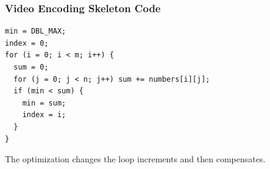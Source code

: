 
\begin{frame}[fragile]
  \frametitle{Video Encoding Skeleton Code}


\begin{lstlisting}
min = DBL_MAX;
index = 0;
for (i = 0; i < m; i++) {
  sum = 0;
  for (j = 0; j < n; j++) sum += numbers[i][j];
  if (min < sum) {
    min = sum;
    index = i;
  }
}
\end{lstlisting}
The optimization changes the loop increments and then compensates. 

\end{frame}





